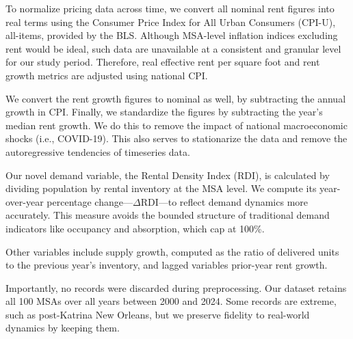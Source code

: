 \documentclass[APA,Times1COL]{WileyNJDv5} %
\begin{document}
To normalize pricing data across time, we convert all nominal rent figures into real terms using the Consumer Price Index for All Urban Consumers (CPI-U), all-items, provided by the BLS. Although MSA-level inflation indices excluding rent would be ideal, such data are unavailable at a consistent and granular level for our study period. Therefore, real effective rent per square foot and rent growth metrics are adjusted using national CPI. 

We convert the rent growth figures to nominal as well, by subtracting the annual growth in CPI. Finally, we standardize the figures by subtracting the year's median rent growth. We do this to remove the impact of national macroeconomic shocks (i.e., COVID-19). This also serves to stationarize the data and remove the autoregressive tendencies of timeseries data.

Our novel demand variable, the Rental Density Index (RDI), is calculated by dividing population by rental inventory at the MSA level. We compute its year-over-year percentage change---\(\Delta\text{RDI}\)---to reflect demand dynamics more accurately. This measure avoids the bounded structure of traditional demand indicators like occupancy and absorption, which cap at 100\%.

Other variables include supply growth, computed as the ratio of delivered units to the previous year's inventory, and lagged variables prior-year rent growth. 

Importantly, no records were discarded during preprocessing. Our dataset retains all 100 MSAs over all years between 2000 and 2024. Some records are extreme, such as post-Katrina New Orleans, but we preserve fidelity to real-world dynamics by keeping them.
\end{document}
